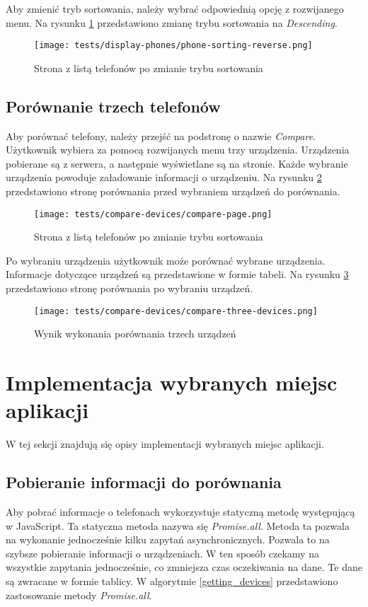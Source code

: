 Aby zmienić tryb sortowania, należy wybrać odpowiednią opcję z rozwijanego menu. Na rysunku \ref{reverse_sorting} przedstawiono zmianę trybu sortowania na \textit{Descending}.
\begin{figure}[H]
  \centering
  \texttt{[image: tests/display-phones/phone-sorting-reverse.png]}
  \caption{Strona z listą telefonów po zmianie trybu sortowania}
  \label{reverse_sorting}
\end{figure}

\subsection{Porównanie trzech telefonów}
Aby porównać telefony, należy przejść na podstronę o nazwie \textit{Compare}. Użytkownik wybiera za pomocą rozwijanych menu trzy urządzenia. Urządzenia pobierane są z serwera, a następnie wyświetlane są na stronie. Każde wybranie urządzenia powoduje załadowanie informacji o urządzeniu. Na rysunku \ref{compare_page} przedstawiono stronę porównania przed wybraniem urządzeń do porównania.
\begin{figure}[H]
  \centering
  \texttt{[image: tests/compare-devices/compare-page.png]}
  \caption{Strona z listą telefonów po zmianie trybu sortowania}
  \label{compare_page}
\end{figure}

Po wybraniu urządzenia użytkownik może porównać wybrane urządzenia. Informacje dotyczące urządzeń są przedstawione w formie tabeli. Na rysunku \ref{compare_three_devices} przedstawiono stronę porównania po wybraniu urządzeń.

\begin{figure}[H]
  \centering
  \texttt{[image: tests/compare-devices/compare-three-devices.png]}
  \caption{Wynik wykonania porównania trzech urządzeń}
  \label{compare_three_devices}
\end{figure}

\section{Implementacja wybranych miejsc aplikacji}
W tej sekcji znajdują się opisy implementacji wybranych miejsc aplikacji. 

\subsection{Pobieranie informacji do porównania}
Aby pobrać informacje o telefonach wykorzystuje statyczną metodę występującą w JavaScript. Ta statyczna metoda nazywa się \textit{Promise.all}. Metoda ta pozwala na wykonanie jednocześnie kilku zapytań asynchronicznych. Pozwala to na szybsze pobieranie informacji o urządzeniach. W ten sposób czekamy na wszystkie zapytania jednocześnie, co zmniejsza czas oczekiwania na dane. Te dane są zwracane w formie tablicy. W algorytmie \ref{getting_devices} przedstawiono zastosowanie metody \textit{Promise.all}.

